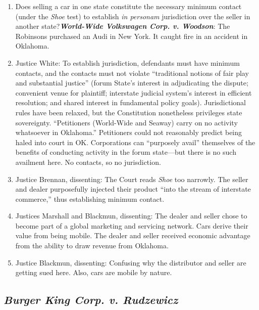 \begin{enumerate}
    \item Does selling a car in one state constitute the necessary minimum 
    contact (under the \emph{Shoe} test) to establish \emph{in personam} 
    jurisdiction over the seller in another state?\textbf{\emph{World-Wide 
    Volkswagen Corp. v. Woodson}}: The Robinsons purchased an Audi in New 
    York. It caught fire in an accident in Oklahoma.   \item Justice White: 
    To establish jurisdiction, defendants must have minimum contacts, and the 
    contacts must not violate ``traditional notions of fair play and 
    substantial justice'' (forum State's interest in adjudicating the dispute; 
    convenient venue for plaintiff; interstate judicial system's interest in 
    efficient resolution; and shared interest in fundamental policy goals). 
    Jurisdictional rules have been relaxed, but the Constitution nonetheless 
    privileges state sovereignty. ``Petitioners (World-Wide and Seaway) carry 
    on no activity whatsoever in Oklahoma.'' Petitioners could not reasonably 
    predict being haled into court in OK. Corporations can ``purposely avail'' 
    themselves of the benefits of conducting activity in the forum state---but 
    there is no such availment here. No contacts, so no jurisdiction.
    \item Justice Brennan, dissenting: The Court reads \emph{Shoe} too 
    narrowly. The seller and dealer purposefully injected their product 
    ``into the stream of interstate commerce,'' thus establishing minimum 
    contact.
    \item Justices Marshall and Blackmun, dissenting: The dealer and seller 
    chose to become part of a global marketing and servicing network. Cars 
    derive their value from being mobile. The dealer and seller received 
    economic advantage from the ability to draw revenue from Oklahoma.
    \item Justice Blackmun, dissenting: Confusing why the distributor and 
    seller are getting sued here. Also, cars are mobile by nature.

\end{enumerate}

\subsection{\emph{Burger King Corp. v. Rudzewicz}}

